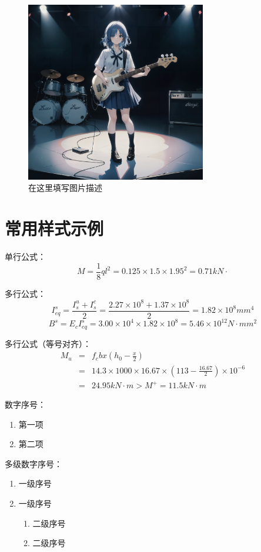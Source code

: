 \documentclass[12pt]{ctexrep}
\begin{document}
            \begin{figure}[h]
                \centering
                \includegraphics[width=0.7\textwidth]{images/sample.jpg}
                \caption{在这里填写图片描述}
            \end{figure}

\chapter{常用样式示例}
    单行公式：
    $$M=\frac{1}{8}ql^2=0.125\times 1.5\times 1.95^2=0.71kN\cdot $$

    多行公式：
    $$I_{eq}^s=\frac{I_s^u+I_s^c}{2}=\frac{2.27\times10^8+1.37\times10^8}{2}=1.82\times10^8mm^4$$
    $$B^s=E_c I_{eq}^s=3.00\times 10^4 \times 1.82 \times 10^8=5.46\times10^{12}N\cdot mm^2$$

    多行公式（等号对齐）：
    \begin{eqnarray}
      M_u&=&f_c bx(h_0-\frac{x}{2})  \nonumber    \\
      ~&=&14.3\times 1000\times 16.67\times (113-\frac{16.67}{2})\times 10^{-6} \nonumber    \\
      ~&=&24.95kN\cdot m >M^+=11.5kN\cdot m \nonumber
    \end{eqnarray}

    数字序号：
    \begin{enumerate}
      \item 第一项
      \item 第二项
    \end{enumerate}

    多级数字序号：
    \begin{enumerate}
      \item 一级序号
      \item 一级序号
      \begin{enumerate}[(1)]
          \item 二级序号
          \item 二级序号
      \end{enumerate}
    \end{enumerate}
\end{document}
